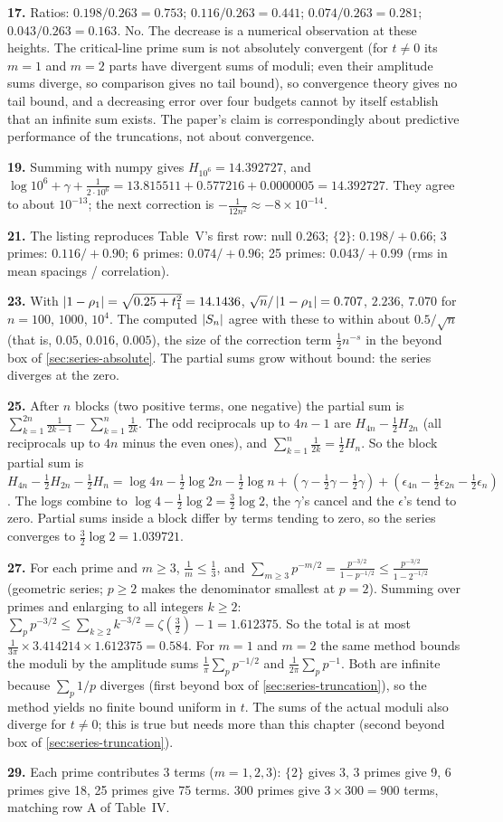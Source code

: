 \textbf{17.} Ratios: $0.198/0.263=0.753$; $0.116/0.263=0.441$; $0.074/0.263=0.281$; $0.043/0.263=0.163$. No. The decrease is a numerical observation at these heights. The critical-line prime sum is not absolutely convergent (for $t\ne0$ its $m=1$ and $m=2$ parts have divergent sums of moduli; even their amplitude sums diverge, so comparison gives no tail bound), so convergence theory gives no tail bound, and a decreasing error over four budgets cannot by itself establish that an infinite sum exists. The paper's claim is correspondingly about predictive performance of the truncations, not about convergence.

\textbf{19.} Summing with numpy gives $H_{10^6}=14.392727$, and $\log10^6+\gamma+\frac1{2\cdot10^6}=13.815511+0.577216+0.0000005=14.392727$. They agree to about $10^{-13}$; the next correction is $-\frac{1}{12n^2}\approx-8\times10^{-14}$.

\textbf{21.} The listing reproduces Table~V's first row: null $0.263$; $\{2\}$: $0.198/+0.66$; 3 primes: $0.116/+0.90$; 6 primes: $0.074/+0.96$; 25 primes: $0.043/+0.99$ (rms in mean spacings / correlation).

\textbf{23.} With $\left\lvert 1-\rho_1\right\rvert=\sqrt{0.25+t_1^2}=14.1436$, $\sqrt n/\left\lvert 1-\rho_1\right\rvert=0.707$, $2.236$, $7.070$ for $n=100$, $1000$, $10^4$. The computed $\left\lvert S_n\right\rvert$ agree with these to within about $0.5/\sqrt n$ (that is, $0.05$, $0.016$, $0.005$), the size of the correction term $\tfrac12n^{-s}$ in the beyond box of \cref{sec:series-absolute}. The partial sums grow without bound: the series diverges at the zero.

\textbf{25.} After $n$ blocks (two positive terms, one negative) the partial sum is $\sum_{k=1}^{2n}\frac1{2k-1}-\sum_{k=1}^n\frac1{2k}$. The odd reciprocals up to $4n-1$ are $H_{4n}-\tfrac12H_{2n}$ (all reciprocals up to $4n$ minus the even ones), and $\sum_{k=1}^n\frac1{2k}=\tfrac12H_n$. So the block partial sum is $H_{4n}-\tfrac12H_{2n}-\tfrac12H_n=\log4n-\tfrac12\log2n-\tfrac12\log n+(\gamma-\tfrac12\gamma-\tfrac12\gamma)+(\epsilon_{4n}-\tfrac12\epsilon_{2n}-\tfrac12\epsilon_n)$. The logs combine to $\log4-\tfrac12\log2=\tfrac32\log2$, the $\gamma$'s cancel and the $\epsilon$'s tend to zero. Partial sums inside a block differ by terms tending to zero, so the series converges to $\tfrac32\log2=1.039721$.

\textbf{27.} For each prime and $m\ge3$, $\frac1m\le\frac13$, and $\sum_{m\ge3}p^{-m/2}=\frac{p^{-3/2}}{1-p^{-1/2}}\le\frac{p^{-3/2}}{1-2^{-1/2}}$ (geometric series; $p\ge2$ makes the denominator smallest at $p=2$). Summing over primes and enlarging to all integers $k\ge2$: $\sum_pp^{-3/2}\le\sum_{k\ge2}k^{-3/2}=\zeta(\tfrac32)-1=1.612375$. So the total is at most $\frac{1}{3\pi}\times3.414214\times1.612375=0.584$. For $m=1$ and $m=2$ the same method bounds the moduli by the amplitude sums $\frac1\pi\sum_pp^{-1/2}$ and $\frac1{2\pi}\sum_pp^{-1}$. Both are infinite because $\sum_p1/p$ diverges (first beyond box of \cref{sec:series-truncation}), so the method yields no finite bound uniform in $t$. The sums of the actual moduli also diverge for $t\ne0$; this is true but needs more than this chapter (second beyond box of \cref{sec:series-truncation}).

\textbf{29.} Each prime contributes 3 terms ($m=1,2,3$): $\{2\}$ gives 3, 3 primes give 9, 6 primes give 18, 25 primes give 75 terms. 300 primes give $3\times300=900$ terms, matching row A of Table~IV.
